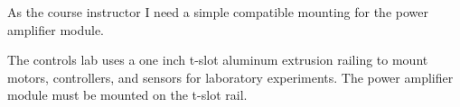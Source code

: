 As the course instructor I need a simple compatible mounting for the power amplifier module.
\bigskip

The controls lab uses a one inch t-slot aluminum extrusion railing to mount motors, controllers, and sensors for laboratory experiments.  The power amplifier module must be mounted on the t-slot rail.
\bigskip
